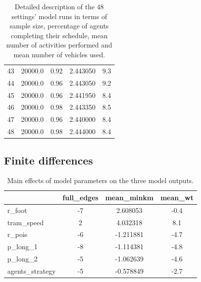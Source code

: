 \begin{table}[H]
{\begin{tabular}{lcccc}
43  &      20000.0 &        0.92 &           2.443050 &              9.3 \\
44  &      20000.0 &        0.96 &           2.443050 &              9.2 \\
45  &      20000.0 &        0.96 &           2.441950 &              8.4 \\
46  &      20000.0 &        0.98 &           2.443350 &              8.5 \\
47  &      20000.0 &        0.96 &           2.440000 &              8.4 \\
48  &      20000.0 &        0.98 &           2.444000 &              8.4 \\
\bottomrule
\end{tabular}}
    \caption{Detailed description of the 48 settings' model runs in terms of sample size, percentage of agents completing their schedule, mean number of activities performed and mean number of vehicles used.}
    \label{tab:runs_tot}
\end{table}


\subsection*{Finite differences} \label{app:fd}

\begin{table}[H]
    \raggedright
\scriptsize{
\begin{tabular}{lccc}
\toprule
{} &  full\_edges &  mean\_minkm &  mean\_wt \\
\midrule
r\_foot          &          -7 &    2.608053 &                  -0.4 \\
tram\_speed      &           2 &    4.032318 &                   8.1 \\
r\_pois          &          -6 &   -1.211881 &                  -4.7 \\
p\_long\_1        &          -8 &   -1.114381 &                  -4.8 \\
p\_long\_2        &          -5 &   -1.062639 &                  -4.6 \\
agents\_strategy &          -5 &   -0.578849 &                  -2.7 \\
\bottomrule
\end{tabular}}
    \caption{Main effects of model parameters on the three model outputs.}
    \label{tab:main_effects}
\end{table}


